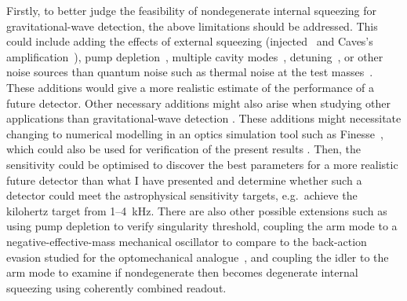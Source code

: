 Firstly, to better judge the feasibility of nondegenerate internal squeezing for gravitational-wave detection, the above limitations should be addressed. This could include adding the effects of external squeezing (injected~\cite{} and Caves's amplification~\cite{}), pump depletion~\cite{}, multiple cavity modes~\cite{liEnhancingInterferometerSensitivity2021,}, detuning~\cite{}, or other noise sources than quantum noise such as thermal noise at the test masses~\cite{}. These additions would give a more realistic estimate of the performance of a future detector. Other necessary additions might also arise when studying other applications than gravitational-wave detection . These additions might necessitate changing to numerical modelling in an optics simulation tool such as Finesse~\cite{}, which could also be used for verification of the present results . Then, the sensitivity could be optimised to discover the best parameters for a more realistic future detector than what I have presented and determine whether such a detector could meet the astrophysical sensitivity targets, e.g.\ achieve the kilohertz target from 1--4~kHz.
There are also other possible extensions such as using pump depletion to verify singularity threshold, coupling the arm mode to a negative-effective-mass mechanical oscillator to compare to the back-action evasion studied for the optomechanical analogue~\cite{}, and coupling the idler to the arm mode to examine if nondegenerate then becomes degenerate internal squeezing using coherently combined readout.

